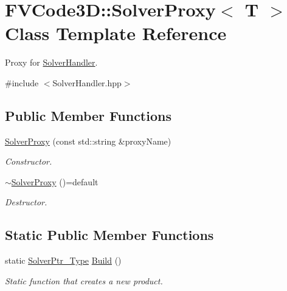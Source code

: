 \hypertarget{classFVCode3D_1_1SolverProxy}{}\section{F\+V\+Code3D\+:\+:Solver\+Proxy$<$ T $>$ Class Template Reference}
\label{classFVCode3D_1_1SolverProxy}


Proxy for \hyperlink{classFVCode3D_1_1SolverHandler}{Solver\+Handler}.  




{\ttfamily \#include $<$Solver\+Handler.\+hpp$>$}

\subsection*{Public Member Functions}
\begin{DoxyCompactItemize}
\item 
\hyperlink{classFVCode3D_1_1SolverProxy_afe54aee3037758e492733076dcc71713}{Solver\+Proxy} (const std\+::string \&proxy\+Name)
\begin{DoxyCompactList}\small\item\em Constructor. \end{DoxyCompactList}\item 
\hyperlink{classFVCode3D_1_1SolverProxy_a2fd8cb3dd542a6e9d420efbdf633c960}{$\sim$\+Solver\+Proxy} ()=default
\begin{DoxyCompactList}\small\item\em Destructor. \end{DoxyCompactList}\end{DoxyCompactItemize}
\subsection*{Static Public Member Functions}
\begin{DoxyCompactItemize}
\item 
static \hyperlink{namespaceFVCode3D_a0b32227a4e5847c2fb27215fb81d9363}{Solver\+Ptr\+\_\+\+Type} \hyperlink{classFVCode3D_1_1SolverProxy_ae8b9170e0a77b713f7f689a5c406b993}{Build} ()
\begin{DoxyCompactList}\small\item\em Static function that creates a new product. \end{DoxyCompactList}\end{DoxyCompactItemize}
